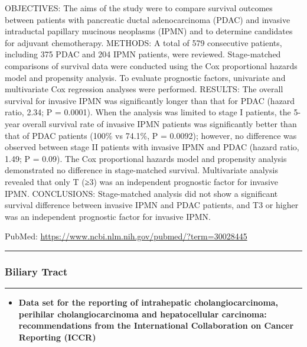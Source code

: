 \documentclass[]{article}
\providecommand{\tightlist}{%
  \setlength{\itemsep}{0pt}\setlength{\parskip}{0pt}}
\begin{document}
OBJECTIVES: The aims of the study were to compare survival outcomes
between patients with pancreatic ductal adenocarcinoma (PDAC) and
invasive intraductal papillary mucinous neoplasms (IPMN) and to
determine candidates for adjuvant chemotherapy. METHODS: A total of 579
consecutive patients, including 375 PDAC and 204 IPMN patients, were
reviewed. Stage-matched comparisons of survival data were conducted
using the Cox proportional hazards model and propensity analysis. To
evaluate prognostic factors, univariate and multivariate Cox regression
analyses were performed. RESULTS: The overall survival for invasive IPMN
was significantly longer than that for PDAC (hazard ratio, 2.34; P =
0.0001). When the analysis was limited to stage I patients, the 5-year
overall survival rate of invasive IPMN patients was significantly better
than that of PDAC patients (100\% vs 74.1\%, P = 0.0092); however, no
difference was observed between stage II patients with invasive IPMN and
PDAC (hazard ratio, 1.49; P = 0.09). The Cox proportional hazards model
and propensity analysis demonstrated no difference in stage-matched
survival. Multivariate analysis revealed that only T (≥3) was an
independent prognostic factor for invasive IPMN. CONCLUSIONS:
Stage-matched analysis did not show a significant survival difference
between invasive IPMN and PDAC patients, and T3 or higher was an
independent prognostic factor for invasive IPMN.

PubMed: \url{https://www.ncbi.nlm.nih.gov/pubmed/?term=30028445}

{}

{}

\begin{center}\rule{0.5\linewidth}{\linethickness}\end{center}

\hypertarget{biliary-tract}{%
\subsubsection{Biliary Tract}\label{biliary-tract}}

\begin{center}\rule{0.5\linewidth}{\linethickness}\end{center}

\begin{itemize}
\tightlist
\item
  \textbf{Data set for the reporting of intrahepatic cholangiocarcinoma,
  perihilar cholangiocarcinoma and hepatocellular carcinoma:
  recommendations from the International Collaboration on Cancer
  Reporting (ICCR)}
\end{itemize}
\end{document}
